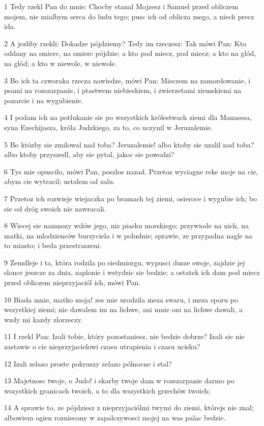 \par 1 Tedy rzekl Pan do mnie: Chocby stanal Mojzesz i Samuel przed obliczem mojem, nie mialbym serca do ludu tego; pusc ich od oblicza mego, a niech precz ida.
\par 2 A jezliby rzekli: Dokadze pójdziemy? Tedy im rzeczesz: Tak mówi Pan: Kto oddany na smierc, na smierc pójdzie; a kto pod miecz, pod miecz; a kto na glód, na glód; a kto w niewole, w niewole.
\par 3 Bo ich ta czworaka rzecza nawiedze, mówi Pan: Mieczem na zamordowanie, i psami na rozszarpanie, i ptastwem niebieskiem, i zwierzetami ziemskiemi na pozarcie i na wygubienie.
\par 4 I podam ich na potlukanie sie po wszystkich królestwach ziemi dla Manasesa, syna Ezechijasza, króla Judzkiego, za to, co uczynil w Jeruzalemie.
\par 5 Bo któzby sie zmilowal nad toba? Jeruzalemie! albo ktoby sie uzalil nad toba? albo ktoby przyszedl, aby sie pytal, jakoc sie powodzi?
\par 6 Tys mie opuscilo, mówi Pan, poszlos nazad. Przetoz wyciagne reke moje na cie, abym cie wytracil; ustalem od zalu.
\par 7 Przetoz ich rozwieje wiejaczka po bramach tej ziemi, osieroce i wygubie ich; bo sie od dróg swoich nie nawracali.
\par 8 Wiecej sie namnozy wdów jego, niz piasku morskiego; przywiode na nich, na matki, na mlodzienców burzyciela i w poludnie; sprawie, ze przypadna nagle na to miasto; i beda przestraszeni.
\par 9 Zemdleje i ta, która rodzila po siedmiorgu, wypusci dusze swoje, zajdzie jej slonce jeszcze za dnia, zaplonie i wstydzic sie bedzie; a ostatek ich dam pod miecz przed obliczem nieprzyjaciól ich, mówi Pan.
\par 10 Biada mnie, matko moja! zes mie urodzila meza swaru, i meza sporu po wszystkiej ziemi; nie dawalem im na lichwe, ani mnie oni na lichwe dawali, a wzdy mi kazdy zlorzeczy.
\par 11 I rzekl Pan: Izali tobie, który pozostaniesz, nie bedzie dobrze? Izali sie nie zastawie o cie nieprzyjacielowi czasu utrapienia i czasu ucisku?
\par 12 Izali zelazo proste pokruszy zelazo pólnocne i stal?
\par 13 Majetnosc twoje, o Judo! i skarby twoje dam w rozszarpanie darmo po wszystkich granicach twoich, a to dla wszystkich grzechów twoich;
\par 14 A sprawie to, ze pójdziesz z nieprzyjaciólmi twymi do ziemi, którejs nie znal; albowiem ogien rozniecony w zapalczywosci mojej na was palac bedzie.
